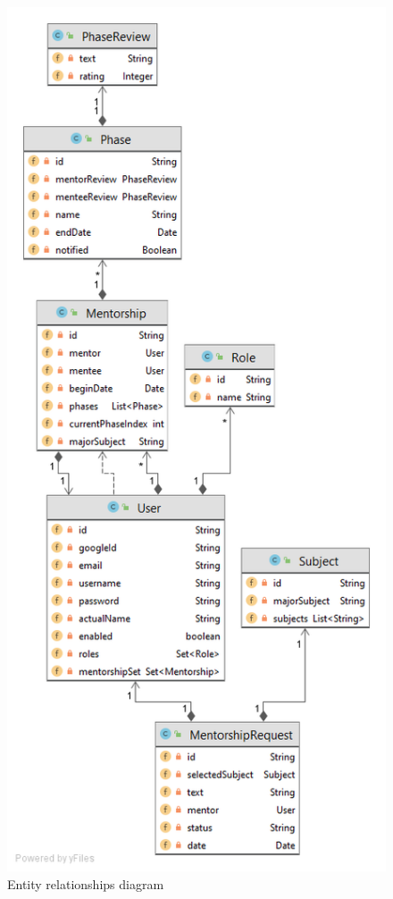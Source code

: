 \documentclass[10pt]{article}
\begin{document}
\begin{figure}[ht!]
    \centering
    \includegraphics[height=0.8\textheight]{diagram-domains.png}
    \caption{Entity relationships diagram}
    \label{fig:domains}
\end{figure}
\end{document}
